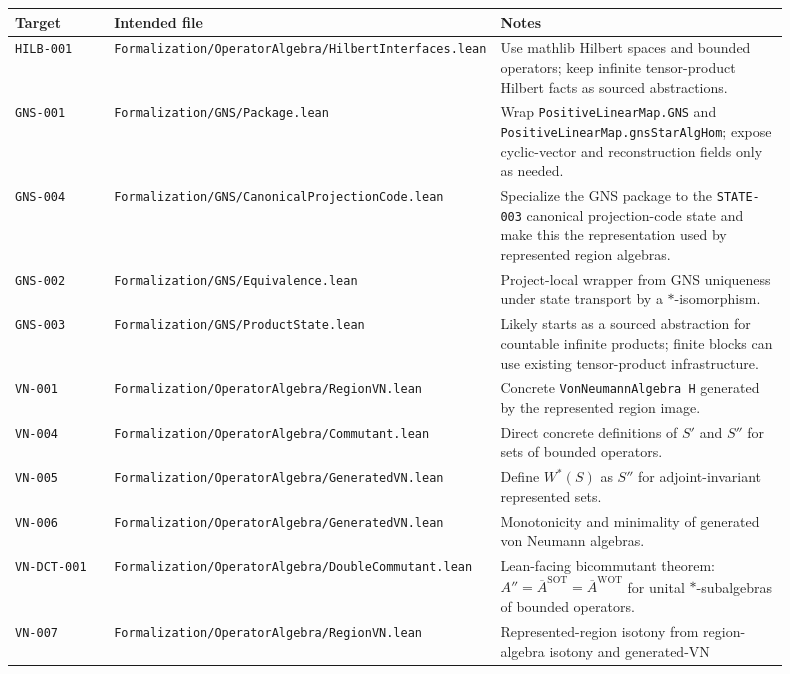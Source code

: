 \documentclass{article}
\begin{document}
\begin{longtable}{@{}p{0.15\linewidth}p{0.35\linewidth}p{0.40\linewidth}@{}}
\toprule
Target & Intended file & Notes \\
\midrule
\endhead
\texttt{HILB-001} &
\texttt{Formalization/OperatorAlgebra/HilbertInterfaces.lean} &
Use mathlib Hilbert spaces and bounded operators; keep infinite tensor-product
Hilbert facts as sourced abstractions. \\
\texttt{GNS-001} &
\texttt{Formalization/GNS/Package.lean} &
Wrap \texttt{PositiveLinearMap.GNS} and
\texttt{PositiveLinearMap.gnsStarAlgHom}; expose cyclic-vector and
reconstruction fields only as needed. \\
\texttt{GNS-004} &
\texttt{Formalization/GNS/CanonicalProjectionCode.lean} &
Specialize the GNS package to the \texttt{STATE-003} canonical projection-code
state and make this the representation used by represented region algebras. \\
\texttt{GNS-002} &
\texttt{Formalization/GNS/Equivalence.lean} &
Project-local wrapper from GNS uniqueness under state transport by a
\(*\)-isomorphism. \\
\texttt{GNS-003} &
\texttt{Formalization/GNS/ProductState.lean} &
Likely starts as a sourced abstraction for countable infinite products; finite
blocks can use existing tensor-product infrastructure. \\
\texttt{VN-001} &
\texttt{Formalization/OperatorAlgebra/RegionVN.lean} &
Concrete \texttt{VonNeumannAlgebra H} generated by the represented region
image. \\
\texttt{VN-004} &
\texttt{Formalization/OperatorAlgebra/Commutant.lean} &
Direct concrete definitions of \(S'\) and \(S''\) for sets of bounded
operators. \\
\texttt{VN-005} &
\texttt{Formalization/OperatorAlgebra/GeneratedVN.lean} &
Define \(W^*(S)\) as \(S''\) for adjoint-invariant represented sets. \\
\texttt{VN-006} &
\texttt{Formalization/OperatorAlgebra/GeneratedVN.lean} &
Monotonicity and minimality of generated von Neumann algebras. \\
\texttt{VN-DCT-001} &
\texttt{Formalization/OperatorAlgebra/DoubleCommutant.lean} &
Lean-facing bicommutant theorem:
\(A''=\overline A^{\mathrm{SOT}}=\overline A^{\mathrm{WOT}}\) for unital
\(*\)-subalgebras of bounded operators. \\
\texttt{VN-007} &
\texttt{Formalization/OperatorAlgebra/RegionVN.lean} &
Represented-region isotony from region-algebra isotony and generated-VN

\end{longtable}
\end{document}
